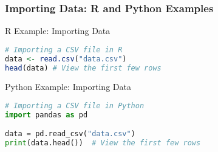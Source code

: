 \documentclass[aspectratio=169]{beamer}
\begin{document}
\begin{frame}[fragile]
    \frametitle{Importing Data: R and Python Examples}
    \begin{block}{R Example: Importing Data}
        \begin{lstlisting}[language=R]
# Importing a CSV file in R
data <- read.csv("data.csv")
head(data) # View the first few rows
        \end{lstlisting}
    \end{block}
    
    \begin{block}{Python Example: Importing Data}
        \begin{lstlisting}[language=Python]
# Importing a CSV file in Python
import pandas as pd

data = pd.read_csv("data.csv")
print(data.head())  # View the first few rows
        \end{lstlisting}
    \end{block}
\end{frame}
\end{document}

